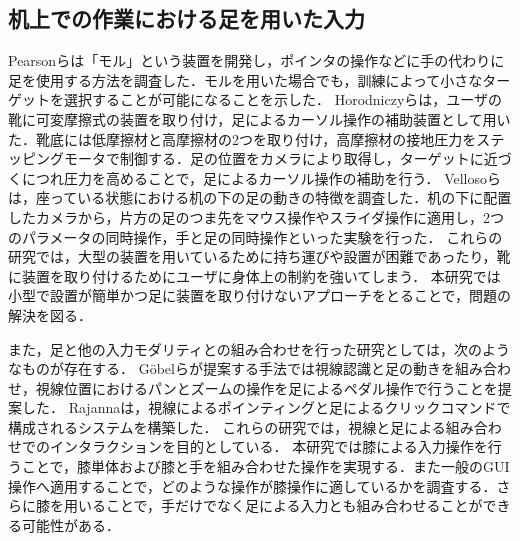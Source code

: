 \documentclass[submit, techrep]{ipsj}
\begin{document}

\subsection{机上での作業における足を用いた入力}
Pearsonら\cite{Pearson:1986:MMD:22627.22392, Pearson:1988:EEP:57167.57169}は「モル」という装置を開発し，ポインタの操作などに手の代わりに足を使用する方法を調査した．モルを用いた場合でも，訓練によって小さなターゲットを選択することが可能になることを示した．
Horodniczyら\cite{Horodniczy:2017:FHE:3025453.3025625}は，ユーザの靴に可変摩擦式の装置を取り付け，足によるカーソル操作の補助装置として用いた．靴底には低摩擦材と高摩擦材の2つを取り付け，高摩擦材の接地圧力をステッピングモータで制御する．足の位置をカメラにより取得し，ターゲットに近づくにつれ圧力を高めることで，足によるカーソル操作の補助を行う．
Vellosoら\cite{velloso:hal-01599657}は，座っている状態における机の下の足の動きの特徴を調査した．机の下に配置したカメラから，片方の足のつま先をマウス操作やスライダ操作に適用し，2つのパラメータの同時操作，手と足の同時操作といった実験を行った．
これらの研究では，大型の装置を用いているために持ち運びや設置が困難であったり，靴に装置を取り付けるためにユーザに身体上の制約を強いてしまう．
本研究では小型で設置が簡単かつ足に装置を取り付けないアプローチをとることで，問題の解決を図る．\par
また，足と他の入力モダリティとの組み合わせを行った研究としては，次のようなものが存在する．
G\"{o}belら\cite{Gobel:2013:GFI:2468356.2479610}が提案する手法では視線認識と足の動きを組み合わせ，視線位置におけるパンとズームの操作を足によるペダル操作で行うことを提案した．
Rajanna\cite{Rajanna:2016:GFI:2876456.2876462}は，視線によるポインティングと足によるクリックコマンドで構成されるシステムを構築した．
これらの研究では，視線と足による組み合わせでのインタラクションを目的としている．
本研究では膝による入力操作を行うことで，膝単体および膝と手を組み合わせた操作を実現する．また一般のGUI操作へ適用することで，どのような操作が膝操作に適しているかを調査する．さらに膝を用いることで，手だけでなく足による入力とも組み合わせることができる可能性がある．
\end{document}
